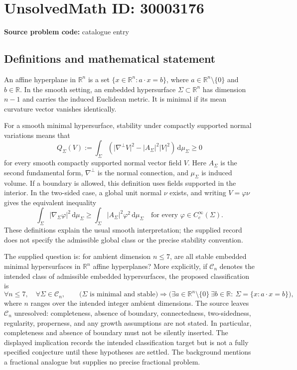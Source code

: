 \documentclass[11pt]{article}
\newcommand{\R}{\mathbb{R}}
\begin{document}
\section*{UnsolvedMath ID: 30003176}
\textbf{Source problem code:} catalogue entry
\subsection{Definitions and mathematical statement}
An affine hyperplane in \(\R^n\) is a set \(\{x\in\R^n:a\cdot x=b\}\), where \(a\in\R^n\setminus\{0\}\) and \(b\in\R\). In the smooth setting, an embedded hypersurface \(\Sigma\subset\R^n\) has dimension \(n-1\) and carries the induced Euclidean metric. It is minimal if its mean curvature vector vanishes identically.

For a smooth minimal hypersurface, stability under compactly supported normal variations means that
\[
Q_\Sigma(V):=\int_\Sigma\left(\lvert\nabla^\perp V\rvert^2-\lvert A_\Sigma\rvert^2\lvert V\rvert^2\right)\,\mathrm d\mu_\Sigma\geq0
\]
for every smooth compactly supported normal vector field \(V\). Here \(A_\Sigma\) is the second fundamental form, \(\nabla^\perp\) is the normal connection, and \(\mu_\Sigma\) is induced volume. If a boundary is allowed, this definition uses fields supported in the interior. In the two-sided case, a global unit normal \(\nu\) exists, and writing \(V=\varphi\nu\) gives the equivalent inequality
\[
\int_\Sigma\lvert\nabla_\Sigma\varphi\rvert^2\,\mathrm d\mu_\Sigma\geq\int_\Sigma\lvert A_\Sigma\rvert^2\varphi^2\,\mathrm d\mu_\Sigma
\quad\text{for every }\varphi\in C_c^\infty(\Sigma).
\]
These definitions explain the usual smooth interpretation; the supplied record does not specify the admissible global class or the precise stability convention.

The supplied question is: for ambient dimension \(n\leq7\), are all stable embedded minimal hypersurfaces in \(\R^n\) affine hyperplanes? More explicitly, if \(\mathcal C_n\) denotes the intended class of admissible embedded hypersurfaces, the proposed classification is
\[
\forall n\leq7,\quad\forall\Sigma\in\mathcal C_n,\qquad
\bigl(\Sigma\text{ is minimal and stable}\bigr)
\Longrightarrow
\bigl(\exists a\in\R^n\setminus\{0\}\ \exists b\in\R:\ \Sigma=\{x:a\cdot x=b\}\bigr),
\]
where \(n\) ranges over the intended integer ambient dimensions. The source leaves \(\mathcal C_n\) unresolved: completeness, absence of boundary, connectedness, two-sidedness, regularity, properness, and any growth assumptions are not stated. In particular, completeness and absence of boundary must not be silently inserted. The displayed implication records the intended classification target but is not a fully specified conjecture until these hypotheses are settled. The background mentions a fractional analogue but supplies no precise fractional problem.
\end{document}
